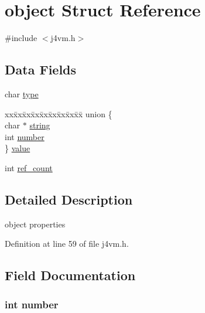 \hypertarget{structobject}{\section{object Struct Reference}
\label{structobject}
}


{\ttfamily \#include $<$j4vm.\+h$>$}

\subsection*{Data Fields}
\begin{DoxyCompactItemize}
\item 
char \hyperlink{structobject_aff17911edc8208aa8ddb1c7c52c78389}{type}
\item 
\begin{tabbing}
xx\=xx\=xx\=xx\=xx\=xx\=xx\=xx\=xx\=\kill
union \{\\
\>char $\ast$ \hyperlink{structobject_aed1cfb225a5fb77461e7972691e68a72}{string}\\
\>int \hyperlink{structobject_a7106e2abc437ad981830d14176d15f09}{number}\\
\} \hyperlink{structobject_a74d70d0c0c333c8edb2c2ce371e4640a}{value}\\

\end{tabbing}\item 
int \hyperlink{structobject_a223a278e0bf3b42ae887efe07bfbeac0}{ref\+\_\+count}
\end{DoxyCompactItemize}


\subsection{Detailed Description}
object properties 

Definition at line 59 of file j4vm.\+h.



\subsection{Field Documentation}
\hypertarget{structobject_a7106e2abc437ad981830d14176d15f09}{
\subsubsection[{number}]{\setlength{\rightskip}{0pt plus 5cm}int number}}\label{structobject_a7106e2abc437ad981830d14176d15f09}


